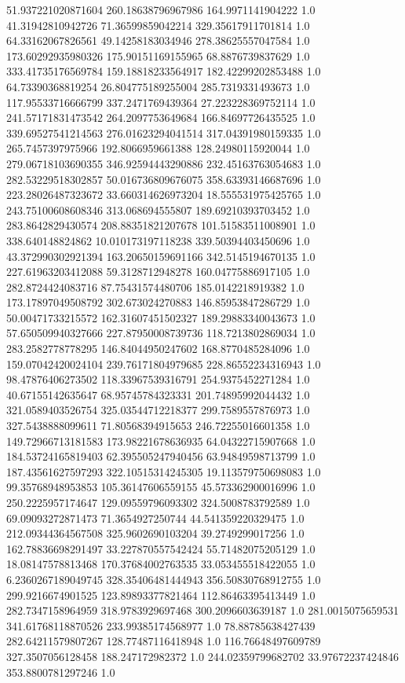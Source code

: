 51.937221020871604	260.18638796967986	164.9971141904222	1.0
41.31942810942726	71.36599859042214	329.35617911701814	1.0
64.33162067826561	49.14258183034946	278.38625557047584	1.0
173.60292935980326	175.90151169155965	68.8876739837629	1.0
333.41735176569784	159.18818233564917	182.42299202853488	1.0
64.73390368819254	26.804775189255004	285.7319331493673	1.0
117.95533716666799	337.2471769439364	27.223228369752114	1.0
241.57171831473542	264.2097753649684	166.84697726435525	1.0
339.69527541214563	276.01623294041514	317.04391980159335	1.0
265.7457397975966	192.8066959661388	128.24980115920044	1.0
279.06718103690355	346.92594443290886	232.45163763054683	1.0
282.53229518302857	50.016736809676075	358.63393146687696	1.0
223.28026487323672	33.660314626973204	18.555531975425765	1.0
243.75100608608346	313.068694555807	189.69210393703452	1.0
283.8642829430574	208.88351821207678	101.51583511008901	1.0
338.640148824862	10.010173197118238	339.50394403450696	1.0
43.372990302921394	163.20650159691166	342.5145194670135	1.0
227.61963203412088	59.3128712948278	160.04775886917105	1.0
282.8724424083716	87.75431574480706	185.0142218919382	1.0
173.17897049508792	302.673024270883	146.85953847286729	1.0
50.00471733215572	162.31607451502327	189.29883340043673	1.0
57.650509940327666	227.87950008739736	118.7213802869034	1.0
283.2582778778295	146.84044950247602	168.8770485284096	1.0
159.07042420024104	239.76171804979685	228.86552234316943	1.0
98.47876406273502	118.33967539316791	254.9375452271284	1.0
40.67155142635647	68.95745784323331	201.74895992044432	1.0
321.0589403526754	325.03544712218377	299.7589557876973	1.0
327.5438888099611	71.80568394915653	246.72255016601358	1.0
149.72966713181583	173.98221678636935	64.04322715907668	1.0
184.53724165819403	62.395505247940456	63.94849598713799	1.0
187.43561627597293	322.10515314245305	19.113579750698083	1.0
99.35768948953853	105.36147606559155	45.573362900016996	1.0
250.2225957174647	129.09559796093302	324.5008783792589	1.0
69.09093272871473	71.3654927250744	44.541359220329475	1.0
212.09344364567508	325.9602690103204	39.2749299017256	1.0
162.78836698291497	33.227870557542424	55.71482075205129	1.0
18.08147578813468	170.37684002763535	33.053455518422055	1.0
6.2360267189049745	328.35406481444943	356.50830768912755	1.0
299.9216674901525	123.89893377821464	112.86463395413449	1.0
282.7347158964959	318.9783929697468	300.2096603639187	1.0
281.0015075659531	341.61768118870526	233.99385174568977	1.0
78.88785638427439	282.64211579807267	128.77487116418948	1.0
116.76648497609789	327.3507056128458	188.247172982372	1.0
244.02359799682702	33.97672237424846	353.8800781297246	1.0
